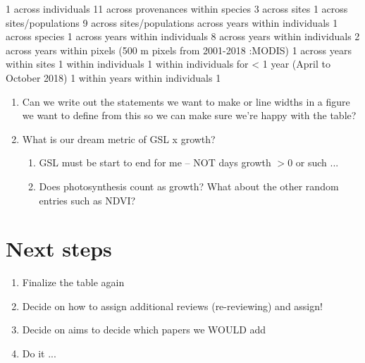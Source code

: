 \documentclass[11pt]{article}
\begin{document}
\newpage
\begin{Schunk}
\begin{Soutput}
                                                              1 
                                             across individuals 
                                                             11 
                              across provenances within species 
                                                              3 
                                                   across sites 
                                                              1 
                                       across sites/populations 
                                                              9 
       across sites/populations across years within individuals 
                                                              1 
                                                 across species 
                                                              1 
                                across years within individuals 
                                                              8 
                        across years within individuals 
                                                              2 
across years within pixels (500 m pixels from 2001-2018 :MODIS) 
                                                              1 
                                      across years within sites 
                                                              1 
                                             within individuals 
                                                              1 
        within individuals for < 1 year (April to October 2018) 
                                                              1 
                                within years within individuals 
                                                              1 
\end{Soutput}
\end{Schunk}


\begin{enumerate}
\item Can we write out the statements we want to make or line widths in a figure we want to define from this so we can make sure we're happy with the table?
\item What is our dream metric of GSL x growth?
\begin{enumerate}
\item GSL must be start to end for me -- NOT days growth $>$0 or such ... 
\item Does photosynthesis count as growth? What about the other random entries such as NDVI?
\end{enumerate}
\end{enumerate}

\section{Next steps}

\begin{enumerate}
\item Finalize the table again
\item Decide on how to assign additional reviews (re-reviewing) and assign!
\item Decide on aims to decide which papers we WOULD add
\item Do it ... 
\end{enumerate}
\end{document}
